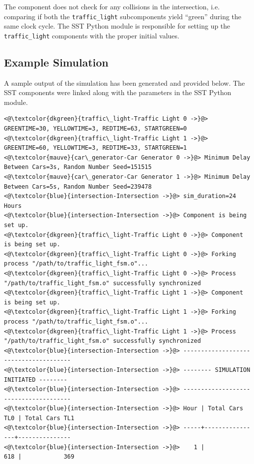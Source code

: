 \documentclass{article}
\begin{document}
      The component does not check for any collisions in the intersection, i.e. comparing if both
      the \lstinline{traffic_light} subcomponents yield ``green'' during the same clock cycle. The
      SST Python module is responsible for setting up the \lstinline{traffic_light} components with
      the proper initial values.

    \subsection{Example Simulation}
    A sample output of the simulation has been generated and provided below. The SST components were linked along with the parameters in the SST Python module.

\begin{lstlisting}[caption={Sample Simulation Output}, captionpos=b]
<@\textcolor{dkgreen}{traffic\_light-Traffic Light 0 ->}@> GREENTIME=30, YELLOWTIME=3, REDTIME=63, STARTGREEN=0
<@\textcolor{dkgreen}{traffic\_light-Traffic Light 1 ->}@> GREENTIME=60, YELLOWTIME=3, REDTIME=33, STARTGREEN=1
<@\textcolor{mauve}{car\_generator-Car Generator 0 ->}@> Minimum Delay Between Cars=3s, Random Number Seed=151515
<@\textcolor{mauve}{car\_generator-Car Generator 1 ->}@> Minimum Delay Between Cars=5s, Random Number Seed=239478
<@\textcolor{blue}{intersection-Intersection ->}@> sim_duration=24 Hours
<@\textcolor{blue}{intersection-Intersection ->}@> Component is being set up.
<@\textcolor{dkgreen}{traffic\_light-Traffic Light 0 ->}@> Component is being set up.
<@\textcolor{dkgreen}{traffic\_light-Traffic Light 0 ->}@> Forking process "/path/to/traffic_light_fsm.o"...
<@\textcolor{dkgreen}{traffic\_light-Traffic Light 0 ->}@> Process "/path/to/traffic_light_fsm.o" successfully synchronized
<@\textcolor{dkgreen}{traffic\_light-Traffic Light 1 ->}@> Component is being set up.
<@\textcolor{dkgreen}{traffic\_light-Traffic Light 1 ->}@> Forking process "/path/to/traffic_light_fsm.o"...
<@\textcolor{dkgreen}{traffic\_light-Traffic Light 1 ->}@> Process "/path/to/traffic_light_fsm.o" successfully synchronized
<@\textcolor{blue}{intersection-Intersection ->}@> --------------------------------------
<@\textcolor{blue}{intersection-Intersection ->}@> -------- SIMULATION INITIATED --------
<@\textcolor{blue}{intersection-Intersection ->}@> --------------------------------------
<@\textcolor{blue}{intersection-Intersection ->}@> Hour | Total Cars TL0 | Total Cars TL1
<@\textcolor{blue}{intersection-Intersection ->}@> -----+----------------+---------------
<@\textcolor{blue}{intersection-Intersection ->}@>    1 |              618 |            369

\end{lstlisting}
\end{document}
